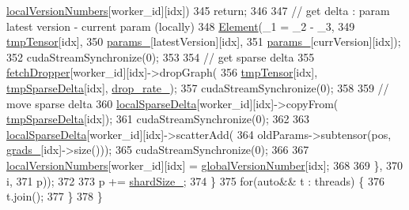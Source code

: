 \begin{DoxyCode}
      \hyperlink{classmarian_1_1AsyncGraphGroup_a51752a96c753b4c3b34a4c8c3eec86ba}{localVersionNumbers}[worker\_id][idx])
345               \textcolor{keywordflow}{return};
346 
347             \textcolor{comment}{// get delta : param latest version - current param (locally)}
348             \hyperlink{namespacemarian_af90a9ca647f95f9d9d18ac8901c55fb1}{Element}(\_1 = \_2 - \_3,
349                     \hyperlink{classmarian_1_1AsyncGraphGroup_a5ae977ce219101bcf4166f123bbb8216}{tmpTensor}[idx],
350                     \hyperlink{classmarian_1_1AsyncGraphGroup_ad1bf15e55cc12b90d39012303b14767b}{params\_}[latestVersion][idx],
351                     \hyperlink{classmarian_1_1AsyncGraphGroup_ad1bf15e55cc12b90d39012303b14767b}{params\_}[currVersion][idx]);
352             cudaStreamSynchronize(0);
353 
354             \textcolor{comment}{// get sparse delta}
355             \hyperlink{classmarian_1_1AsyncGraphGroup_a67f02023b00ba1a67e1f8894dbb7123a}{fetchDropper}[worker\_id][idx]->dropGraph(
356                 \hyperlink{classmarian_1_1AsyncGraphGroup_a5ae977ce219101bcf4166f123bbb8216}{tmpTensor}[idx], \hyperlink{classmarian_1_1AsyncGraphGroup_aac1e70623a858adb914f6ed6a491c3a8}{tmpSparseDelta}[idx], 
      \hyperlink{classmarian_1_1AsyncGraphGroup_a774969ba69bab8fbd48e6454bbe7e54c}{drop\_rate\_});
357             cudaStreamSynchronize(0);
358 
359             \textcolor{comment}{// move sparse delta}
360             \hyperlink{classmarian_1_1AsyncGraphGroup_aa29abae307772ca69402a19729b2b49d}{localSparseDelta}[worker\_id][idx]->copyFrom(
      \hyperlink{classmarian_1_1AsyncGraphGroup_aac1e70623a858adb914f6ed6a491c3a8}{tmpSparseDelta}[idx]);
361             cudaStreamSynchronize(0);
362 
363             \hyperlink{classmarian_1_1AsyncGraphGroup_aa29abae307772ca69402a19729b2b49d}{localSparseDelta}[worker\_id][idx]->scatterAdd(
364                 oldParams->subtensor(pos, \hyperlink{classmarian_1_1AsyncGraphGroup_ad2f8bc6900976be4426acc4631d07145}{grads\_}[idx]->size()));
365             cudaStreamSynchronize(0);
366 
367             \hyperlink{classmarian_1_1AsyncGraphGroup_a51752a96c753b4c3b34a4c8c3eec86ba}{localVersionNumbers}[worker\_id][idx] = 
      \hyperlink{classmarian_1_1AsyncGraphGroup_a75884703e6fe8efb3c75293eb912bce4}{globalVersionNumber}[idx];
368 
369           \},
370           i,
371           p));
372 
373       p += \hyperlink{classmarian_1_1AsyncGraphGroup_a3af39dcadc6a7f84a4a906f2048fd420}{shardSize\_};
374     \}
375     \textcolor{keywordflow}{for}(\textcolor{keyword}{auto}&& t : threads) \{
376       t.join();
377     \}
378   \}
\end{DoxyCode}


